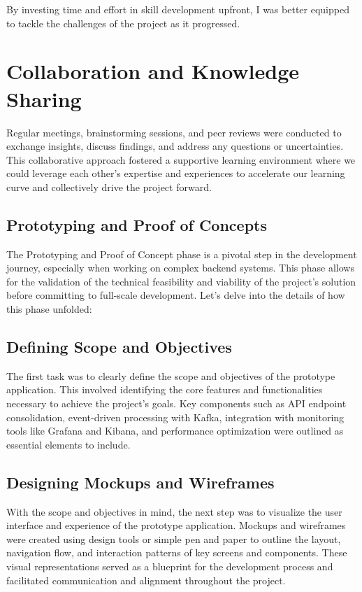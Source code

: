 \documentclass[12pt,a4paper]{report}
\begin{document}
By investing time and effort in skill development upfront, I was better equipped to tackle the challenges of the project as it progressed.


\section{Collaboration and Knowledge Sharing}

Regular meetings, brainstorming sessions, and peer reviews were conducted to exchange insights, discuss findings, and address any questions or uncertainties. This collaborative approach fostered a supportive learning environment where we could leverage each other’s expertise and experiences to accelerate our learning curve and collectively drive the project forward.

\subsection{Prototyping and Proof of Concepts}

The Prototyping and Proof of Concept phase is a pivotal step in the development journey, especially when working on complex backend systems. This phase allows for the validation of the technical feasibility and viability of the project’s solution before committing to full-scale development. Let’s delve into the details of how this phase unfolded:

\subsection{Defining Scope and Objectives}

The first task was to clearly define the scope and objectives of the prototype application. This involved identifying the core features and functionalities necessary to achieve the project’s goals. Key components such as API endpoint consolidation, event-driven processing with Kafka, integration with monitoring tools like Grafana and Kibana, and performance optimization were outlined as essential elements to include.

\subsection{Designing Mockups and Wireframes}

With the scope and objectives in mind, the next step was to visualize the user interface and experience of the prototype application. Mockups and wireframes were created using design tools or simple pen and paper to outline the layout, navigation flow, and interaction patterns of key screens and components. These visual representations served as a blueprint for the development process and facilitated communication and alignment throughout the project.
\end{document}
